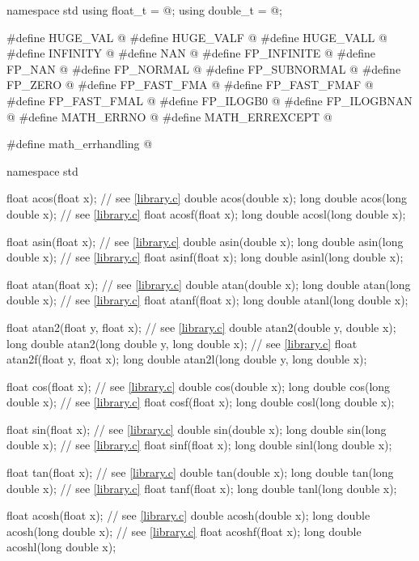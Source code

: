 \begin{codeblock}
namespace std {
  using float_t = @\seebelow@;
  using double_t = @\seebelow@;
}

#define HUGE_VAL @\seebelow@
#define HUGE_VALF @\seebelow@
#define HUGE_VALL @\seebelow@
#define INFINITY @\seebelow@
#define NAN @\seebelow@
#define FP_INFINITE @\seebelow@
#define FP_NAN @\seebelow@
#define FP_NORMAL @\seebelow@
#define FP_SUBNORMAL @\seebelow@
#define FP_ZERO @\seebelow@
#define FP_FAST_FMA @\seebelow@
#define FP_FAST_FMAF @\seebelow@
#define FP_FAST_FMAL @\seebelow@
#define FP_ILOGB0 @\seebelow@
#define FP_ILOGBNAN @\seebelow@
#define MATH_ERRNO @\seebelow@
#define MATH_ERREXCEPT @\seebelow@

#define math_errhandling @\seebelow@

namespace std {
  float acos(float x);  // see \ref{library.c}
  double acos(double x);
  long double acos(long double x);  // see \ref{library.c}
  float acosf(float x);
  long double acosl(long double x);

  float asin(float x);  // see \ref{library.c}
  double asin(double x);
  long double asin(long double x);  // see \ref{library.c}
  float asinf(float x);
  long double asinl(long double x);

  float atan(float x);  // see \ref{library.c}
  double atan(double x);
  long double atan(long double x);  // see \ref{library.c}
  float atanf(float x);
  long double atanl(long double x);

  float atan2(float y, float x);  // see \ref{library.c}
  double atan2(double y, double x);
  long double atan2(long double y, long double x);  // see \ref{library.c}
  float atan2f(float y, float x);
  long double atan2l(long double y, long double x);

  float cos(float x);  // see \ref{library.c}
  double cos(double x);
  long double cos(long double x);  // see \ref{library.c}
  float cosf(float x);
  long double cosl(long double x);

  float sin(float x);  // see \ref{library.c}
  double sin(double x);
  long double sin(long double x);  // see \ref{library.c}
  float sinf(float x);
  long double sinl(long double x);

  float tan(float x);  // see \ref{library.c}
  double tan(double x);
  long double tan(long double x);  // see \ref{library.c}
  float tanf(float x);
  long double tanl(long double x);

  float acosh(float x);  // see \ref{library.c}
  double acosh(double x);
  long double acosh(long double x);  // see \ref{library.c}
  float acoshf(float x);
  long double acoshl(long double x);

}
\end{codeblock}
